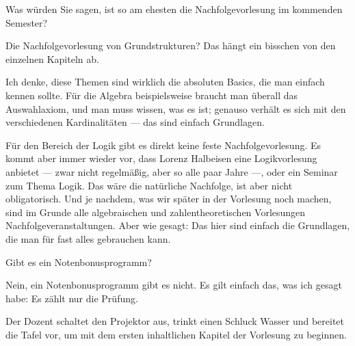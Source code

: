 \begin{student-interaction}[Studentenfrage]
Was würden Sie sagen, ist so am ehesten die Nachfolgevorlesung im kommenden Semester?
\end{student-interaction}

\begin{spoken-clean}[00:22:15 - 00:24:00]
Die Nachfolgevorlesung von Grundstrukturen? Das hängt ein bisschen von den einzelnen Kapiteln ab.

Ich denke, diese Themen sind wirklich die absoluten Basics, die man einfach kennen sollte. Für die Algebra beispielsweise braucht man überall das Auswahlaxiom, und man muss wissen, was es ist; genauso verhält es sich mit den verschiedenen Kardinalitäten --- das sind einfach Grundlagen.

Für den Bereich der Logik gibt es direkt keine feste Nachfolgevorlesung. Es kommt aber immer wieder vor, dass Lorenz Halbeisen eine Logikvorlesung anbietet --- zwar nicht regelmäßig, aber so alle paar Jahre ---, oder ein Seminar zum Thema Logik. Das wäre die natürliche Nachfolge, ist aber nicht obligatorisch. Und je nachdem, was wir später in der Vorlesung noch machen, sind im Grunde alle algebraischen und zahlentheoretischen Vorlesungen Nachfolgeveranstaltungen. Aber wie gesagt: Das hier sind einfach die Grundlagen, die man für fast alles gebrauchen kann.
\end{spoken-clean}

\begin{ai-global-state-checkpoint-invisible-content}
\end{ai-global-state-checkpoint-invisible-content}

\begin{student-interaction}[Studentenfrage]
Gibt es ein Notenbonusprogramm?
\end{student-interaction}

\begin{spoken-clean}[00:24:00 - 00:24:44]
Nein, ein Notenbonusprogramm gibt es nicht. Es gilt einfach das, was ich gesagt habe: Es zählt nur die Prüfung.
\end{spoken-clean}

\begin{meta-note}[Tafelübergang]
Der Dozent schaltet den Projektor aus, trinkt einen Schluck Wasser und bereitet die Tafel vor, um mit dem ersten inhaltlichen Kapitel der Vorlesung zu beginnen.
\end{meta-note}

